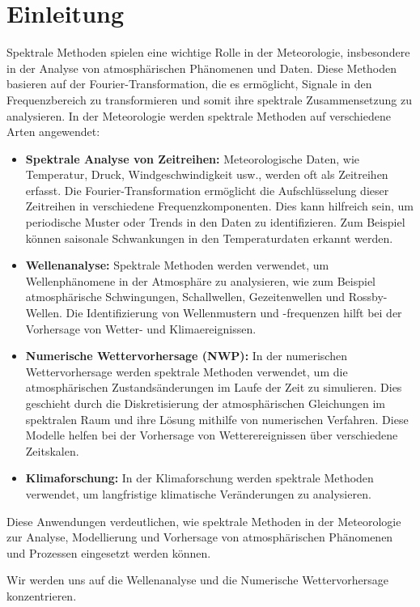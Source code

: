 %
%
%
%
\section{Einleitung\label{spektral:section:Einleitung}}

Spektrale Methoden spielen eine wichtige Rolle in der Meteorologie, insbesondere in der Analyse von atmosphärischen Phänomenen und Daten.
Diese Methoden basieren auf der Fourier-Trans\-for\-ma\-tion, die es ermöglicht, Signale in den Frequenzbereich zu transformieren und somit ihre spektrale Zusammensetzung zu analysieren.
In der Meteorologie werden spektrale Methoden auf verschiedene Arten angewendet:

\begin{itemize}
\item
\textbf{Spektrale Analyse von Zeitreihen:} Meteorologische Daten, wie Temperatur, Druck, Windgeschwindigkeit usw., werden oft als Zeitreihen erfasst.
Die Fourier-Transformation ermöglicht die Aufschlüsselung dieser Zeitreihen in verschiedene Frequenzkomponenten.
Dies kann hilfreich sein, um periodische Muster oder Trends in den Daten zu identifizieren. 
Zum Beispiel können saisonale Schwankungen in den Temperaturdaten erkannt werden.
\item
\textbf{Wellenanalyse:} Spektrale Methoden werden verwendet, um Wellenphänomene in der Atmosphäre zu analysieren, wie zum Beispiel atmosphärische Schwingungen, Schallwellen, Gezeitenwellen und Rossby-Wellen.
Die Identifizierung von Wellenmustern und -frequenzen hilft bei der Vorhersage von Wetter- und Klimaereignissen.
\item
\textbf{Numerische Wettervorhersage (NWP):} In der numerischen Wettervorhersage werden spektrale Methoden verwendet, um die atmosphärischen Zustandsänderungen im Laufe der Zeit zu simulieren.
Dies geschieht durch die Diskretisierung der atmosphärischen Gleichungen im spektralen Raum und ihre Lösung mithilfe von numerischen Verfahren.
Diese Modelle helfen bei der Vorhersage von Wetterereignissen über verschiedene Zeitskalen.
\item
\textbf{Klimaforschung:} In der Klimaforschung werden spektrale Methoden verwendet, um langfristige klimatische Veränderungen zu analysieren.
\end{itemize}

Diese Anwendungen verdeutlichen, wie spektrale Methoden in der Meteorologie zur Analyse, Modellierung und Vorhersage von atmosphärischen Phänomenen und Prozessen eingesetzt werden können.

Wir werden uns auf die Wellenanalyse und die Numerische Wettervorhersage konzentrieren.